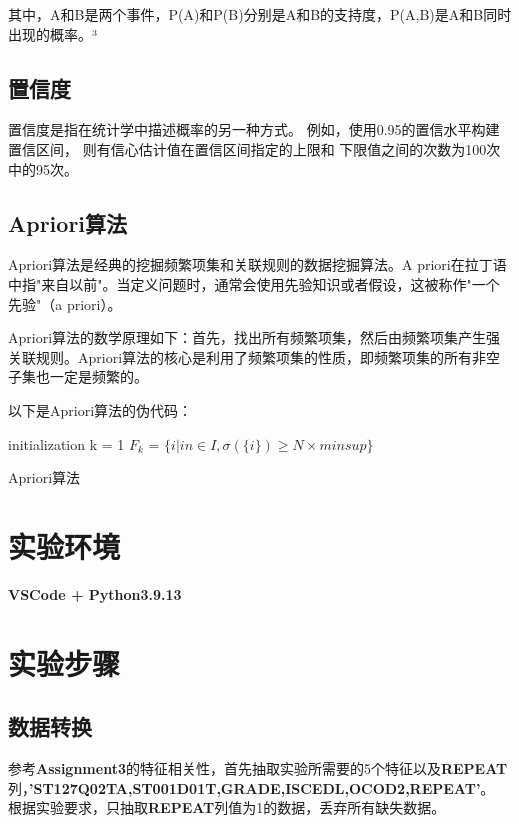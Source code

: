 \documentclass[12pt, a4paper, oneside]{ctexart}
\begin{document}
其中，A和B是两个事件，P(A)和P(B)分别是A和B的支持度，P(A,B)是A和B同时出现的概率。³
\subsection{置信度}
置信度是指在统计学中描述概率的另一种方式。
例如，使用0.95的置信水平构建置信区间，
则有信心估计值在置信区间指定的上限和
下限值之间的次数为100次中的95次。

\subsection{Apriori算法}
Apriori算法是经典的挖掘频繁项集和关联规则的数据挖掘算法。A priori在拉丁语中指"来自以前"。当定义问题时，通常会使用先验知识或者假设，这被称作"一个先验"（a priori）。

Apriori算法的数学原理如下：首先，找出所有频繁项集，然后由频繁项集产生强关联规则。Apriori算法的核心是利用了频繁项集的性质，即频繁项集的所有非空子集也一定是频繁的。

以下是Apriori算法的伪代码：
\begin{algorithm}[h]
    \SetAlgoLined

    initialization\;
    k = 1\;
    $F_{k}$ = $\{i | in \in I, \sigma(\{i\}) \geq N \times minsup\}$\;

    \caption{Apriori算法}
    \label{algo:algorithm1}
\end{algorithm}
\section{实验环境}
\textbf{VSCode + Python3.9.13}
\section{实验步骤}
\subsection{数据转换}
参考\textbf{Assignment3}的特征相关性，首先抽取实验所需要的5个特征以及\textbf{REPEAT}列，\textbf{'ST127Q02TA,ST001D01T,GRADE,ISCEDL,OCOD2,REPEAT'}。
根据实验要求，只抽取\textbf{REPEAT}列值为1的数据，丢弃所有缺失数据。
\end{document}
